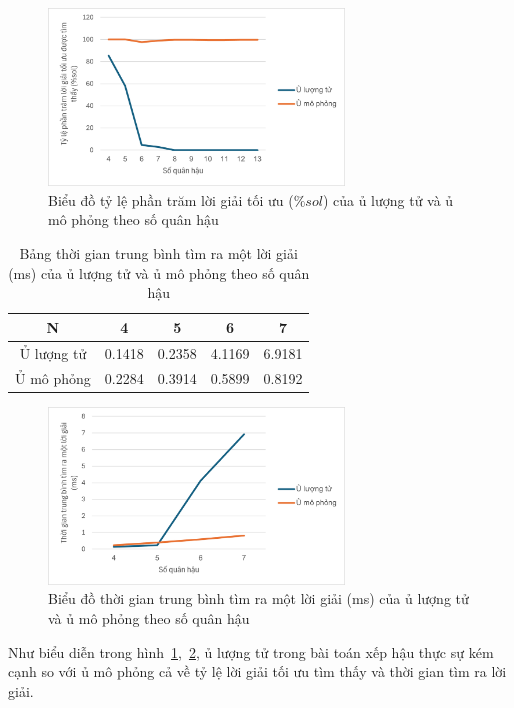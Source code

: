 	
	\begin{figure}[H]
		\centering
		\includegraphics[width=0.7\textwidth]{images/SA_QA/sol.png}
		\caption{Biểu đồ tỷ lệ phần trăm lời giải tối ưu ($\%sol$)  của ủ lượng tử và ủ mô phỏng theo số quân hậu}
		\label{fig:SA_QA/sol}
	\end{figure}
	
	
	\begin{table}[H]
		\centering
		\begin{tabular}{|c|c|c|c|c|}
			\hline
			N & 4 & 5 & 6 & 7 \\
			\hline
			Ủ lượng tử & 0.1418 & 0.2358 & 4.1169 & 6.9181 \\
			\hline
			Ủ mô phỏng & 0.2284 & 0.3914 & 0.5899 & 0.8192 \\
			\hline
		\end{tabular}
		
		
		\caption{Bảng thời gian trung bình tìm ra một lời giải (ms)  của ủ lượng tử và ủ mô phỏng theo số quân hậu}
		\label{tab:SA_QA/TTS}
	\end{table}
	\begin{figure}[H]
		\centering
		\includegraphics[width=0.7\textwidth]{images/SA_QA/TTS.png}
		\caption{Biểu đồ thời gian trung bình tìm ra một lời giải (ms)  của ủ lượng tử và ủ mô phỏng theo số quân hậu}
		\label{fig:SA_QA/TTS}
	\end{figure}
	
Như biểu diễn trong hình~\ref{fig:SA_QA/sol},~\ref{fig:SA_QA/TTS}, ủ lượng tử trong bài toán xếp hậu thực sự kém cạnh so với ủ mô phỏng cả về tỷ lệ lời giải tối ưu tìm thấy và thời gian tìm ra lời giải.
	